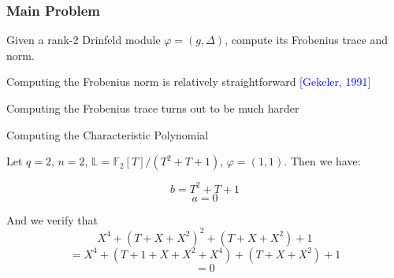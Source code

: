 \documentclass{beamer}
\newcommand{\f}{\mathbb{F}}
\newcommand{\blue}{\textcolor{blue}}
\newcommand{\spa}{\vspace{0.2cm}}
\newcommand{\spa}{\textnormal{ }}
\begin{document}

\begin{frame}
\frametitle{Main Problem}

\begin{problem}
Given a rank-2 Drinfeld module $\varphi = (g,\Delta)$, compute its Frobenius trace and norm.
\end{problem}

\spa

 Computing the Frobenius norm is relatively straightforward \blue{[Gekeler, 1991]}
 
 \spa
 
 Computing the Frobenius trace turns out to be much harder

\end{frame}

\begin{frame}{Computing the Characteristic Polynomial}
\begin{example}
Let $q = 2$, $n = 2$, $\mathbb{L} = \mathbb{F}_2[T]/(T^2 + T + 1)$, $\varphi = (1,1)$. Then we have:

\[ b = T^2 + T +1\]
\[ a = 0\]

And we verify that
\[ X^{4} + (T + X +X^2)^2 + (T + X +X^2) + 1\]
\[ = X^{4} + (T +1 + X + X^2 + X^4) + (T + X +X^2) + 1\]
\[ = 0\]




\end{example}
\end{frame}









\end{document}

